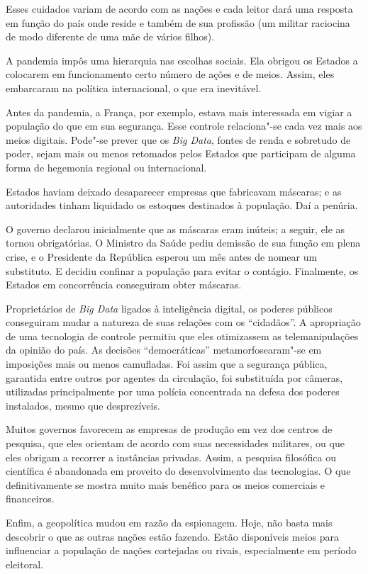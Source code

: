 Esses cuidados variam de acordo com as nações e cada leitor dará uma
resposta em função do país onde reside e também de sua profissão (um
militar raciocina de modo diferente de uma mãe de vários filhos).

A pandemia impôs uma hierarquia nas escolhas sociais. Ela obrigou os
Estados a colocarem em funcionamento certo número de ações e de meios.
Assim, eles embarcaram na política internacional, o que era inevitável.

Antes da pandemia, a França, por exemplo, estava mais interessada em
vigiar a população do que em sua segurança. Esse controle relaciona"-se
cada vez mais aos meios digitais. Pode"-se prever que os \emph{Big Data},
fontes de renda e sobretudo de poder, sejam mais ou menos retomados
pelos Estados que participam de alguma forma de hegemonia regional ou
internacional.

Estados haviam deixado desaparecer empresas que fabricavam máscaras; e
as autoridades tinham liquidado os estoques destinados à população. Daí
a penúria.

O governo declarou inicialmente que as máscaras eram inúteis; a seguir,
ele as tornou obrigatórias. O Ministro da Saúde pediu demissão de sua
função em plena crise, e o Presidente da República esperou um mês antes
de nomear um substituto. E decidiu confinar a população para evitar o
contágio. Finalmente, os Estados em concorrência conseguiram obter
máscaras.

Proprietários de \emph{Big Data} ligados à inteligência digital, os
poderes públicos conseguiram mudar a natureza de suas relações com os
``cidadãos''. A apropriação de uma tecnologia de controle permitiu que
eles otimizassem as telemanipulações da opinião do país. As decisões
``democráticas'' metamorfosearam"-se em imposições mais ou menos
camufladas. Foi assim que a segurança pública, garantida entre outros
por agentes da circulação, foi substituída por câmeras, utilizadas
principalmente por uma polícia concentrada na defesa dos poderes
instalados, mesmo que desprezíveis.

Muitos governos favorecem as empresas de produção em vez dos centros de
pesquisa, que eles orientam de acordo com suas necessidades militares,
ou que eles obrigam a recorrer a instâncias privadas. Assim, a pesquisa
filosófica ou científica é abandonada em proveito do desenvolvimento das
tecnologias. O que definitivamente se mostra muito mais benéfico para os
meios comerciais e financeiros.

Enfim, a geopolítica mudou em razão da espionagem. Hoje, não basta mais
descobrir o que as outras nações estão fazendo. Estão disponíveis meios
para influenciar a população de nações cortejadas ou rivais,
especialmente em período eleitoral.

